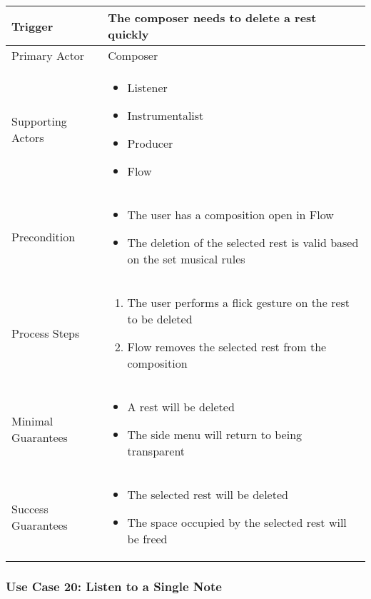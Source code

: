 \begin{tabularx}{\textwidth}{|X|X|}
\hline
Trigger & 
The composer needs to delete a rest quickly \\
\hline
Primary Actor & 
Composer\\
\hline
Supporting Actors & 
\begin{itemize}
\item Listener
\item Instrumentalist
\item Producer
\item Flow
\end{itemize} \\
\hline
Precondition & 
\begin{itemize}
\item The user has a composition open in Flow 
\item The deletion of the selected rest is valid based on the set musical rules
\end{itemize} \\
\hline
Process Steps & 
\begin{enumerate}
\item The user performs a flick gesture on the rest to be deleted
\item Flow removes the selected rest from the composition
\end{enumerate} \\
\hline
Minimal Guarantees & 
\begin{itemize}
  \item A rest will be deleted
  \item The side menu will return to being transparent
\end{itemize} \\
\hline
Success Guarantees & 
\begin{itemize}
  \item The selected rest will be deleted
  \item The space occupied by the selected rest will be freed
\end{itemize} \\
\hline
\end{tabularx}

\subsubsection{Use Case 20: Listen to a Single Note}

